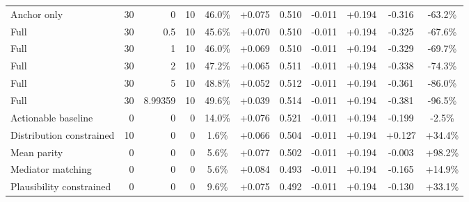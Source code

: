 \begin{table}[htbp]
\begin{tabular}{lrrrccccccc}
Anchor only & 30 & 0 & 10 & 46.0\% & +0.075 & 0.510 & -0.011 & +0.194 & -0.316 & -63.2\% \\
Full & 30 & 0.5 & 10 & 45.6\% & +0.070 & 0.510 & -0.011 & +0.194 & -0.325 & -67.6\% \\
Full & 30 & 1 & 10 & 46.0\% & +0.069 & 0.510 & -0.011 & +0.194 & -0.329 & -69.7\% \\
Full & 30 & 2 & 10 & 47.2\% & +0.065 & 0.511 & -0.011 & +0.194 & -0.338 & -74.3\% \\
Full & 30 & 5 & 10 & 48.8\% & +0.052 & 0.512 & -0.011 & +0.194 & -0.361 & -86.0\% \\
Full & 30 & 8.99359 & 10 & 49.6\% & +0.039 & 0.514 & -0.011 & +0.194 & -0.381 & -96.5\% \\
Actionable baseline & 0 & 0 & 0 & 14.0\% & +0.076 & 0.521 & -0.011 & +0.194 & -0.199 & -2.5\% \\
Distribution constrained & 10 & 0 & 0 & 1.6\% & +0.066 & 0.504 & -0.011 & +0.194 & +0.127 & +34.4\% \\
Mean parity & 0 & 0 & 0 & 5.6\% & +0.077 & 0.502 & -0.011 & +0.194 & -0.003 & +98.2\% \\
Mediator matching & 0 & 0 & 0 & 5.6\% & +0.084 & 0.493 & -0.011 & +0.194 & -0.165 & +14.9\% \\
Plausibility constrained & 0 & 0 & 0 & 9.6\% & +0.075 & 0.492 & -0.011 & +0.194 & -0.130 & +33.1\% \\
\bottomrule
\end{tabular}
\end{table}